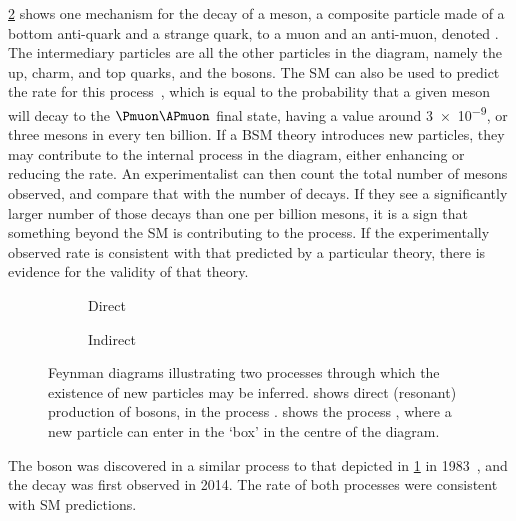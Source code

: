 \cref{fig:intro:sm:particle_production:indirect} shows one mechanism for the 
decay of a \PBs meson, a composite particle made of a bottom anti-quark and a 
strange quark, to a muon and an anti-muon, denoted \decay{\PBs}{\Pmuon\APmuon}.
The intermediary particles are all the other particles in the diagram, namely 
the up, charm, and top quarks, and the \PW bosons.
The \ac{SM} can also be used to predict the rate for this 
process~\cite{Bobeth:2013uxa}, which is equal to the probability that a given 
\PBs meson will decay to the $\Pmuon\APmuon$ final state, having a value around 
\num{3e-9}, or three \PBs mesons in every ten billion.
If a \ac{BSM} theory introduces new particles, they may contribute to the 
internal process in the diagram, either enhancing or reducing the rate.
An experimentalist can then count the total number of \PBs mesons observed, and 
compare that with the number of \decay{\PBs}{\Pmuon\APmuon} decays.
If they see a significantly larger number of those decays than one per billion 
\PBs mesons, it is a sign that something beyond the \ac{SM} is contributing to 
the process.
If the experimentally observed rate is consistent with that predicted by a 
particular theory, there is evidence for the validity of that theory.

\begin{figure}
  \begin{subfigure}[b]{0.4\textwidth}
    \centering
    
    \caption{Direct}
    \label{fig:intro:sm:particle_production:direct}
  \end{subfigure}
  \begin{subfigure}[b]{0.6\textwidth}
    \centering
    
    \caption{Indirect}
    \label{fig:intro:sm:particle_production:indirect}
  \end{subfigure}
  \caption{%
    Feynman diagrams illustrating two processes through which the existence of 
    new particles may be inferred.
     shows direct (resonant) 
    production of \PZ bosons, in the process 
    \decay{\Pelectron\APelectron}{\Pmuon\APmuon}.
     shows the process 
    \decay{\PBs}{\Pmuon\APmuon}, where a new particle can enter in the `box' in 
    the centre of the diagram.
  }
  \label{fig:intro:sm:particle_production}
\end{figure}

The \PZ boson was discovered in a similar process to that depicted in 
\cref{fig:intro:sm:particle_production:direct} in 
1983~\cite{1983398,BAGNAIA1983130}, and the decay \decay{\PBs}{\Pmuon\APmuon} 
was first observed in 2014.
The rate of both processes were consistent with \ac{SM} predictions.

